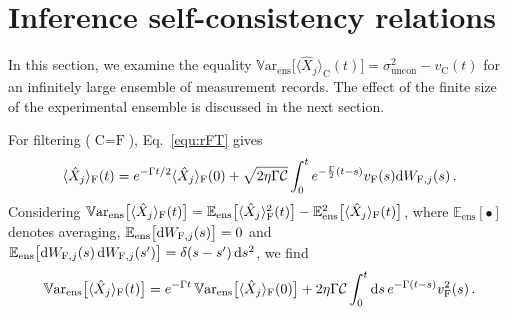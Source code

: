 \documentclass[aps,prx,onecolumn,superscriptaddress,floatfix,longbibliography,amsmath,amssymb]{revtex4-2}
\newcommand{\fil}{_{\text F}}
\newcommand{\dd}{{\rm d}}
\newcommand{\ex}[1]{\langle #1 \rangle}
\newcommand{\beq}{\begin{equation}}
\newcommand{\eeq}{\end{equation}}
\begin{document}
\section{Inference self-consistency relations}\label{SecConsistency}

In this section, we examine the equality $\mathbb{V}\text{ar}_{\text{ens}}\big[\langle\hat{X}_j\rangle_\text{C}(t)\big]=\sigma^2_\text{uncon}-v_\text{C}(t)$ for an infinitely large ensemble of measurement records. The effect of the finite size of the experimental ensemble is discussed in the next section.

For filtering ($\text{C}=\text{F}$), Eq.~\eqref{equ:rFT} gives
\beq
\ex{\hat{X}_j}\fil(t) = e^{-\Gamma t/2}\ex{\hat{X}_j}\fil(0) + \sqrt{2\eta\Gamma {\cal C}}\int_{0}^{t} e^{-\frac{\Gamma}{2}(t - s)} v\fil(s)\dd W_{{\rm F},j}(s)\,.
\eeq
Considering $\mathbb{V}\text{ar}_{\text{ens}}\big[\langle\hat{X}_j\rangle_\text{F}(t)\big]={\mathbb E}_{\text{ens}}\big[\ex{\hat{X}_j}_\text{F}^2(t)\big] - {\mathbb E}^2_{\text{ens}}\big[\ex{\hat{X}_j}\fil(t)\big]$, where ${\mathbb E}_{\text{ens}}[\bullet]$ denotes averaging, ${\mathbb E}_{\text{ens}}\big[\dd W_{{\rm F},j}(s)\big] = 0$ and ${\mathbb E}_{\text{ens}}\big[\dd W_{{\rm F},j}(s)\,\dd W_{{\rm F},j}(s')\big] = \delta(s-s')\,\dd s^2$, we find
\beq
\mathbb{V}\text{ar}_{\text{ens}}\big[\langle\hat{X}_j\rangle_\text{F}(t)\big] = e^{-\Gamma t}\,\mathbb{V}\text{ar}_{\text{ens}}\big[\langle\hat{X}_j\rangle_\text{F}(0)\big] + 2\eta\Gamma \mathcal{C}\int_{0}^{t} \dd s\,e^{-\Gamma (t - s)}v^2_\text{F}(s)\,. 
\eeq
\end{document}

